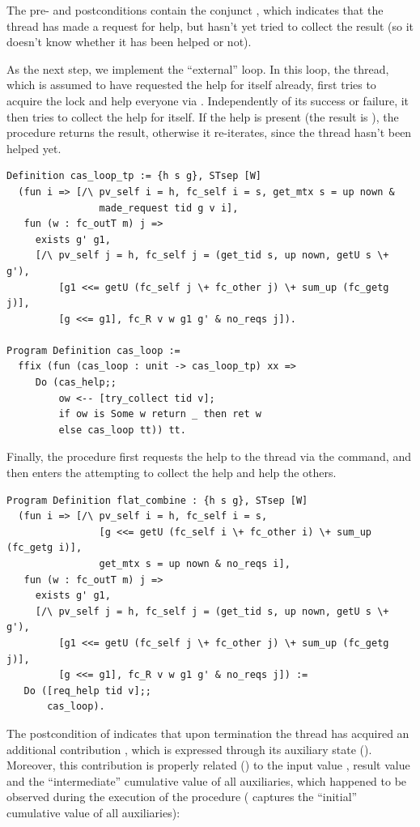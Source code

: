 The pre- and postconditions contain the conjunct , which indicates that the thread has made a request for
help, but hasn't yet tried to collect the result (so it doesn't know
whether it has been helped or not).

As the next step, we implement the ``external'' loop. In this loop, the
thread, which is assumed to have requested the help for itself
already, first tries to acquire the lock and help everyone via
. Independently of its success or failure, it then
tries to collect the help for itself. If the help is present (the
result  is ), the procedure returns the result,
otherwise it re-iterates, since the thread hasn't been helped yet.

\begin{lstlisting}
Definition cas_loop_tp := {h s g}, STsep [W] 
  (fun i => [/\ pv_self i = h, fc_self i = s, get_mtx s = up nown &
                made_request tid g v i],
   fun (w : fc_outT m) j => 
     exists g' g1,
     [/\ pv_self j = h, fc_self j = (get_tid s, up nown, getU s \+ g'), 
         [g1 <<= getU (fc_self j \+ fc_other j) \+ sum_up (fc_getg j)], 
         [g <<= g1], fc_R v w g1 g' & no_reqs j]).

Program Definition cas_loop := 
  ffix (fun (cas_loop : unit -> cas_loop_tp) xx => 
     Do (cas_help;; 
         ow <-- [try_collect tid v];
         if ow is Some w return _ then ret w
         else cas_loop tt)) tt.
\end{lstlisting}

Finally, the  procedure first requests the help to
the thread  via the  command, and then enters
the  attempting to collect the help and help the others.

\begin{lstlisting}
Program Definition flat_combine : {h s g}, STsep [W] 
  (fun i => [/\ pv_self i = h, fc_self i = s, 
                [g <<= getU (fc_self i \+ fc_other i) \+ sum_up (fc_getg i)],
                get_mtx s = up nown & no_reqs i],
   fun (w : fc_outT m) j => 
     exists g' g1,
     [/\ pv_self j = h, fc_self j = (get_tid s, up nown, getU s \+ g'), 
         [g1 <<= getU (fc_self j \+ fc_other j) \+ sum_up (fc_getg j)],
         [g <<= g1], fc_R v w g1 g' & no_reqs j]) := 
   Do ([req_help tid v];; 
       cas_loop).  
\end{lstlisting}

The postcondition of  indicates that upon
termination the thread has acquired an additional contribution
, which is expressed through its auxiliary state (). Moreover, this contribution is properly related
() to the input value , result value
 and the ``intermediate'' cumulative value  of all
auxiliaries, which happened to be observed during the execution of the
procedure ( captures the ``initial'' cumulative value of all
auxiliaries):

